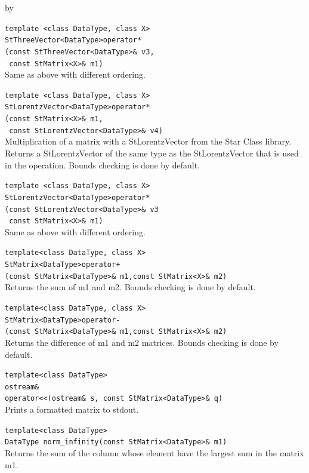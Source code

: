 \documentclass[twoside]{article}
\newcommand{\entrylabel}[1]{\mbox{\textbf{{#1}}}\hfil}%
\newenvironment{entry}
{\begin{list}{}%
    {\renewcommand{\makelabel}{\entrylabel}%
     \setlength{\labelwidth}{90pt}%
     \setlength{\leftmargin}{\labelwidth}
     \advance\leftmargin by \labelsep%
      }%
    }%
  {\end{list}}
\newcommand{\Entrylabel}[1]%
{\raisebox{0pt}[1ex][0pt]{\makebox[\labelwidth][l]%
    {\parbox[t]{\labelwidth}{\hspace{0pt}\textbf{{#1}}}}}}
\newenvironment{Entry}%
{\renewcommand{\entrylabel}{\Entrylabel}\begin{entry}}%
  {\end{entry}}
\begin{document}
\begin{description}
\begin{Entry}
  \verb+template <class DataType, class X>+\\
  \verb+StThreeVector<DataType>operator*+\\
  \verb+(const StThreeVector<DataType>& v3,+\\
  \verb+ const StMatrix<X>& m1)+\\
  Same as above with different ordering.
  
  \verb+template <class DataType, class X>+\\
  \verb+StLorentzVector<DataType>operator*+\\
  \verb+(const StMatrix<X>& m1,+\\
  \verb+ const StLorentzVector<DataType>& v4)+\\
  Multiplication of a matrix with a StLorentzVector from the
  Star Class library.  Returns a StLorentzVector of the
  same type as the StLorentzVector that is used in the operation.
  Bounds checking is done by default.

  \verb+template <class DataType, class X>+\\
  \verb+StLorentzVector<DataType>operator*+\\
  \verb+(const StLorentzVector<DataType>& v3+\\
  \verb+ const StMatrix<X>& m1)+\\
  Same as above with different ordering.

  \verb+template<class DataType, class X>+\\
  \verb#StMatrix<DataType>operator+#\\
  \verb#(const StMatrix<DataType>& m1,const StMatrix<X>& m2)#\\
  Returns the sum of m1 and m2.  Bounds checking is
  done by default.

  \verb+template<class DataType, class X>+\\
  \verb+StMatrix<DataType>operator-+\\
  \verb+(const StMatrix<DataType>& m1,const StMatrix<X>& m2)+\\
  Returns the difference of m1 and m2 matrices.  Bounds checking is
  done by default.

  \verb+template<class DataType>+\\
  \verb+ostream&+\\
  \verb+operator<<(ostream& s, const StMatrix<DataType>& q)+\\
  Prints a formatted matrix to stdout.

  \verb+template<class DataType>+\\
  \verb+DataType norm_infinity(const StMatrix<DataType>& m1)+\\
  Returns the sum of the column whose element have
  the largest sum in the matrix m1.


\end{Entry}
\end{description}
\end{document}
